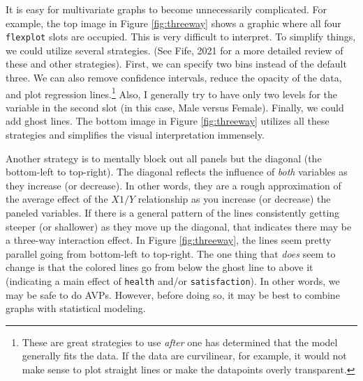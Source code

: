 \documentclass[
  english,
  man]{apa6}
\begin{document}
It is easy for multivariate graphs to become unnecessarily complicated. For example, the top image in Figure \ref{fig:threeway} shows a graphic where all four \texttt{flexplot} slots are occupied. This is very difficult to interpret. To simplify things, we could utilize several strategies. (See Fife, 2021 for a more detailed review of these and other strategies). First, we can specify two bins instead of the default three. We can also remove confidence intervals, reduce the opacity of the data, and plot regression lines.\footnote{These are great strategies to use \emph{after} one has determined that the model generally fits the data. If the data are curvilinear, for example, it would not make sense to plot straight lines or make the datapoints overly transparent.} Also, I generally try to have only two levels for the variable in the second slot (in this case, Male versus Female). Finally, we could add ghost lines. The bottom image in Figure \ref{fig:threeway} utilizes all these strategies and simplifies the visual interpretation immensely.

Another strategy is to mentally block out all panels but the diagonal (the bottom-left to top-right). The diagonal reflects the influence of \emph{both} variables as they increase (or decrease). In other words, they are a rough approximation of the average effect of the \(X1/Y\) relationship as you increase (or decrease) the paneled variables. If there is a general pattern of the lines consistently getting steeper (or shallower) as they move up the diagonal, that indicates there may be a three-way interaction effect. In Figure \ref{fig:threeway}, the lines seem pretty parallel going from bottom-left to top-right. The one thing that \emph{does} seem to change is that the colored lines go from below the ghost line to above it (indicating a main effect of \texttt{health} and/or \texttt{satisfaction}). In other words, we may be safe to do AVPs. However, before doing so, it may be best to combine graphs with statistical modeling.

\small
\end{document}

